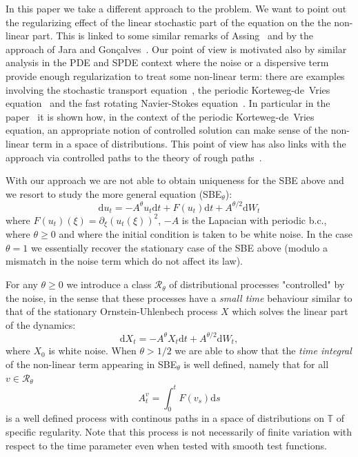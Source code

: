 \documentclass[11pt,a4paper,reqno]{amsart}
\newcommand{\TT}{\mathbb{T}}
\newcommand{\dd}{\mathrm{d}}
\begin{document}
In this paper we take a different approach to the problem. We want to point out the regularizing effect of the linear stochastic part of the equation on the the non-linear part. This is linked to some similar remarks of Assing~\cite{assing1,assing2} and by the approach of Jara and Gon\c{c}alves~\cite{JG}. Our point of view is motivated also by similar analysis in the PDE and SPDE context where the noise or a dispersive term provide enough regularization to treat some non-linear term: there are examples involving the stochastic transport equation~\cite{FGP}, the periodic Korteweg-de~Vries equation~\cites{kdv,babin-kdv} and the fast rotating Navier-Stokes equation~\cite{babin-ns}. In particular in the paper~\cite{kdv} it is shown how, in the context of the periodic Korteweg-de~Vries equation, an appropriate notion of controlled solution can make sense of the non-linear term in a space of distributions. This point of view has also links with the approach via controlled paths to the theory of rough paths~\cite{controlling}.


With our approach we are not able to obtain uniqueness for the SBE above and we resort to study the more general equation (SBE$_\theta$):
\begin{equation}
\label{eq:burgers-theta}
\dd u_t = - A^\theta u_t \dd t + F(u_t) \dd t + A^{\theta/2} \dd W_t 
\end{equation}
where $F(u_t)(\xi)=\partial_\xi (u_t(\xi))^2$, $-A$ is the Lapacian with periodic b.c., where $\theta\ge 0$ and where the initial condition is taken to be white noise. In the case $\theta=1$ we essentially recover the stationary case of the SBE above (modulo a mismatch in the noise term which do not affect its law). 

For any $\theta \ge 0$ we introduce a class $\mathcal{R}_\theta$ of distributional processes "controlled" by the noise, in the sense that these processes have a  \emph{small time} behaviour similar to that of the stationary  Ornstein-Uhlenbech process $X$  which solves the linear part of the dynamics:
\begin{equation}
\label{eq:ou-theta}
\dd X_t = - A^\theta X_t \dd t + A^{\theta/2} \dd W_t,
\end{equation}
where $X_0$ is white noise.
 When $\theta > 1/2$ we are able to show that the \emph{time integral} of the non-linear term appearing in SBE$_\theta$ is well defined, namely that for all $v\in \mathcal{R}_\theta$ 
\begin{equation}
\label{eq:drift-process}
A^v_t = \int_0 ^t F(v_s) \dd s
\end{equation}
is a well defined process with continous paths in a space of distributions on $\TT$ of specific regularity. Note that this process is not necessarily of finite variation with respect to the time parameter even when tested with smooth test functions. 
\end{document}
